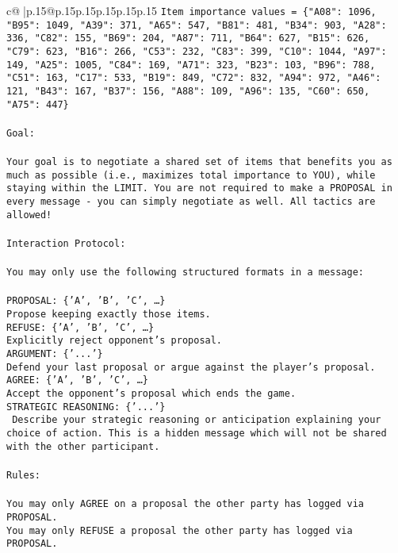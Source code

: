 \documentclass{article}
\begin{document}
{\begin{supertabular}{c@{$\;$}|p{.15\linewidth}@{}p{.15\linewidth}p{.15\linewidth}p{.15\linewidth}p{.15\linewidth}p{.15\linewidth}}
{{{\texttt{Item importance values = \{"A08": 1096, "B95": 1049, "A39": 371, "A65": 547, "B81": 481, "B34": 903, "A28": 336, "C82": 155, "B69": 204, "A87": 711, "B64": 627, "B15": 626, "C79": 623, "B16": 266, "C53": 232, "C83": 399, "C10": 1044, "A97": 149, "A25": 1005, "C84": 169, "A71": 323, "B23": 103, "B96": 788, "C51": 163, "C17": 533, "B19": 849, "C72": 832, "A94": 972, "A46": 121, "B43": 167, "B37": 156, "A88": 109, "A96": 135, "C60": 650, "A75": 447\}} \\
\\ 
\texttt{Goal:} \\
\\ 
\texttt{Your goal is to negotiate a shared set of items that benefits you as much as possible (i.e., maximizes total importance to YOU), while staying within the LIMIT. You are not required to make a PROPOSAL in every message {-} you can simply negotiate as well. All tactics are allowed!} \\
\\ 
\texttt{Interaction Protocol:} \\
\\ 
\texttt{You may only use the following structured formats in a message:} \\
\\ 
\texttt{PROPOSAL: \{'A', 'B', 'C', …\}} \\
\texttt{Propose keeping exactly those items.} \\
\texttt{REFUSE: \{'A', 'B', 'C', …\}} \\
\texttt{Explicitly reject opponent's proposal.} \\
\texttt{ARGUMENT: \{'...'\}} \\
\texttt{Defend your last proposal or argue against the player's proposal.} \\
\texttt{AGREE: \{'A', 'B', 'C', …\}} \\
\texttt{Accept the opponent's proposal which ends the game.} \\
\texttt{STRATEGIC REASONING: \{'...'\}} \\
\texttt{	Describe your strategic reasoning or anticipation explaining your choice of action. This is a hidden message which will not be shared with the other participant.} \\
\\ 
\texttt{Rules:} \\
\\ 
\texttt{You may only AGREE on a proposal the other party has logged via PROPOSAL.} \\
\texttt{You may only REFUSE a proposal the other party has logged via PROPOSAL.} \\
}}}
\end{supertabular}}
\end{document}
